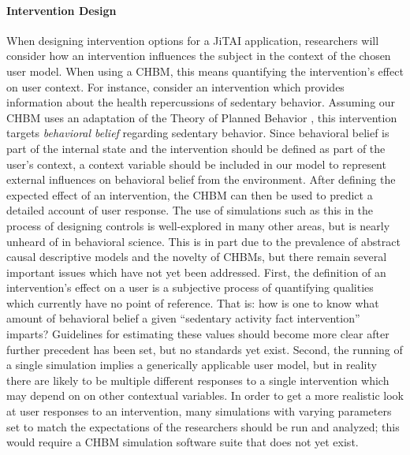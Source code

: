\documentclass[runningheads,a4paper]{llncs}
\begin{document}
\paragraph{Intervention Design}
When designing intervention options for a JiTAI application, researchers will consider how an intervention influences the subject in the context of the chosen user model.
When using a CHBM, this means quantifying the intervention's effect on user context.
For instance, consider an intervention which provides information about the health repercussions of sedentary behavior.
Assuming our CHBM uses an adaptation of the Theory of Planned Behavior \cite{Bandura???}, this intervention targets \emph{behavioral belief} regarding sedentary behavior.
Since behavioral belief is part of the internal state and the intervention should be defined as part of the user's context, a context variable should be included in our model to represent external influences on behavioral belief from the environment.
After defining the expected effect of an intervention, the CHBM can then be used to predict a detailed account of user response.
The use of simulations such as this in the process of designing controls is well-explored in many other areas, but is nearly unheard of in behavioral science.
This is in part due to the prevalence of abstract causal descriptive models and the novelty of CHBMs, but there remain several important issues which have not yet been addressed.
First, the definition of an intervention's effect on a user is a subjective process of quantifying qualities which currently have no point of reference.
That is: how is one to know what amount of behavioral belief a given ``sedentary activity fact intervention'' imparts?
Guidelines for estimating these values should become more clear after further precedent has been set, but no standards yet exist.
Second, the running of a single simulation implies a generically applicable user model, but in reality there are likely to be multiple different responses to a single intervention which may depend on on other contextual variables. 
In order to get a more realistic look at user responses to an intervention, many simulations with varying parameters set to match the expectations of the researchers should be run and analyzed; this would require a CHBM simulation software suite that does not yet exist.
\end{document}
